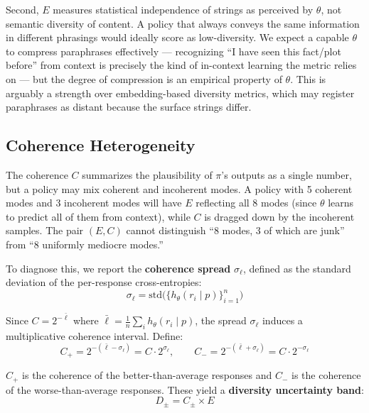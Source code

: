 \documentclass[11pt]{article}
\begin{document}
Second, $E$ measures statistical independence of strings as perceived by $\theta$, not semantic diversity of content. A policy that always conveys the same information in different phrasings would ideally score as low-diversity. We expect a capable $\theta$ to compress paraphrases effectively --- recognizing ``I have seen this fact/plot before'' from context is precisely the kind of in-context learning the metric relies on --- but the degree of compression is an empirical property of $\theta$. This is arguably a strength over embedding-based diversity metrics, which may register paraphrases as distant because the surface strings differ.

\subsection{Coherence Heterogeneity}\label{sec:coherence-hetero}

The coherence $C$ summarizes the plausibility of $\pi$'s outputs as a single number, but a policy may mix coherent and incoherent modes. A policy with 5 coherent modes and 3 incoherent modes will have $E$ reflecting all 8 modes (since $\theta$ learns to predict all of them from context), while $C$ is dragged down by the incoherent samples. The pair $(E, C)$ cannot distinguish ``8 modes, 3 of which are junk'' from ``8 uniformly mediocre modes.''

To diagnose this, we report the \textbf{coherence spread} $\sigma_\ell$, defined as the standard deviation of the per-response cross-entropies:
\begin{equation}
    \sigma_\ell = \mathrm{std}\bigl(\{h_\theta(r_i \mid p)\}_{i=1}^n\bigr)
\end{equation}

Since $C = 2^{-\bar{\ell}}$ where $\bar{\ell} = \frac{1}{n}\sum_i h_\theta(r_i \mid p)$, the spread $\sigma_\ell$ induces a multiplicative coherence interval. Define:
\begin{equation}
    C_+ = 2^{-(\bar{\ell} - \sigma_\ell)} = C \cdot 2^{\sigma_\ell}, \qquad C_- = 2^{-(\bar{\ell} + \sigma_\ell)} = C \cdot 2^{-\sigma_\ell}
\end{equation}

$C_+$ is the coherence of the better-than-average responses and $C_-$ is the coherence of the worse-than-average responses. These yield a \textbf{diversity uncertainty band}:
\begin{equation}
    D_\pm = C_\pm \times E
\end{equation}
\end{document}
